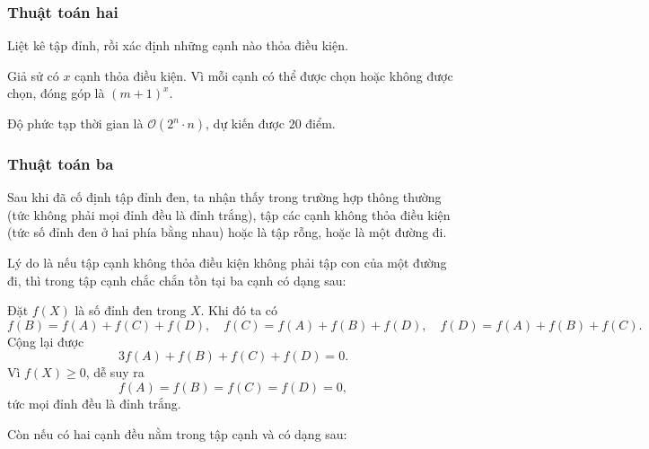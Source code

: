 \documentclass[11pt]{article}
\newcommand{\Oh}{\mathcal{O}}
\begin{document}
\subsubsection{Thuật toán hai}

Liệt kê tập đỉnh, rồi xác định những cạnh nào thỏa điều kiện.

Giả sử có \(x\) cạnh thỏa điều kiện. Vì mỗi cạnh có thể được chọn hoặc không
được chọn, đóng góp là \((m+1)^x\).

Độ phức tạp thời gian là \(\Oh(2^n\cdot n)\), dự kiến được \(20\) điểm.

\subsubsection{Thuật toán ba}

Sau khi đã cố định tập đỉnh đen, ta nhận thấy trong trường hợp thông thường
(tức không phải mọi đỉnh đều là đỉnh trắng), tập các cạnh không thỏa điều kiện
(tức số đỉnh đen ở hai phía bằng nhau) hoặc là tập rỗng, hoặc là một đường đi.

Lý do là nếu tập cạnh không thỏa điều kiện không phải tập con của một đường đi,
thì trong tập cạnh chắc chắn tồn tại ba cạnh có dạng sau:

\begin{center}
\end{center}

Đặt \(f(X)\) là số đỉnh đen trong \(X\). Khi đó ta có
\[
  f(B)=f(A)+f(C)+f(D),\quad
  f(C)=f(A)+f(B)+f(D),\quad
  f(D)=f(A)+f(B)+f(C).
\]
Cộng lại được
\[
  3f(A)+f(B)+f(C)+f(D)=0.
\]
Vì \(f(X)\ge 0\), dễ suy ra
\[
  f(A)=f(B)=f(C)=f(D)=0,
\]
tức mọi đỉnh đều là đỉnh trắng.

Còn nếu có hai cạnh đều nằm trong tập cạnh và có dạng sau:

\begin{center}
\end{center}
\end{document}
